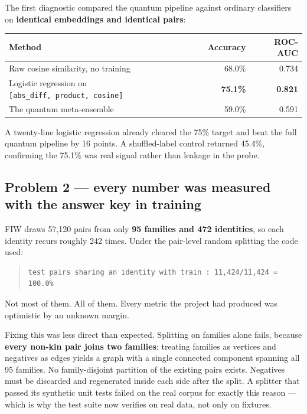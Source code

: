 \documentclass[11pt,a4paper]{article}
\begin{document}
The first diagnostic compared the quantum pipeline against ordinary classifiers
on \textbf{identical embeddings and identical pairs}:

\begin{center}
\small
\begin{tabular}{lrr}
\toprule
Method & Accuracy & ROC-AUC \\
\midrule
Raw cosine similarity, no training & 68.0\% & 0.734 \\
Logistic regression on \texttt{[abs\_diff,~product,~cosine]} & \textbf{75.1\%} & \textbf{0.821} \\
The quantum meta-ensemble & 59.0\% & 0.591 \\
\bottomrule
\end{tabular}
\end{center}


A twenty-line logistic regression already cleared the 75\% target and beat the
full quantum pipeline by 16 points. A shuffled-label control returned 45.4\%,
confirming the 75.1\% was real signal rather than leakage in the probe.

\subsection*{Problem 2 — every number was measured with the answer key in training}

FIW draws 57,120 pairs from only \textbf{95 families and 472 identities}, so each
identity recurs roughly 242 times. Under the pair-level random splitting the
code used:

\begin{quote}\small\begin{verbatim}
test pairs sharing an identity with train : 11,424/11,424 = 100.0%
\end{verbatim}\end{quote}


Not most of them. All of them. Every metric the project had produced was
optimistic by an unknown margin.

Fixing this was less direct than expected. Splitting on families alone fails,
because \textbf{every non-kin pair joins two families}: treating families as vertices
and negatives as edges yields a graph with a single connected component
spanning all 95 families. No family-disjoint partition of the existing pairs
exists. Negatives must be discarded and regenerated inside each side after the
split. A splitter that passed its synthetic unit tests failed on the real corpus
for exactly this reason — which is why the test suite now verifies on real data,
not only on fixtures.
\end{document}
